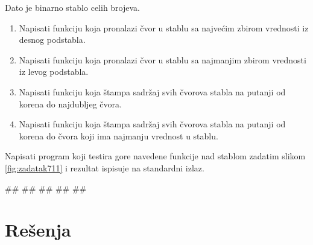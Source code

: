 \begin{Exercise}[label=711]
Dato je binarno stablo celih brojeva.
\begin{enumerate}
\item Napisati funkciju koja pronalazi čvor u stablu sa najvećim zbirom vrednosti iz desnog podstabla.
\item Napisati funkciju koja pronalazi čvor u stablu sa najmanjim zbirom vrednosti iz levog podstabla.
\item Napisati funkciju koja štampa sadržaj svih čvorova stabla na putanji od korena do najdubljeg čvora.
\item Napisati funkciju koja štampa sadržaj svih čvorova stabla na putanji od korena do čvora koji ima najmanju vrednost u stablu.
\end{enumerate}
Napisati program koji testira gore navedene funkcije nad stablom zadatim slikom \ref{fig:zadatak711} i rezultat ispisuje na standardni izlaz.  

\begin{maxitest}
\begin{test}{1}
#\naslovIzlaz#
##
##
##
##
\end{test}
\end{maxitest}

\end{Exercise}


\section{Rešenja}
\shipoutAnswer
